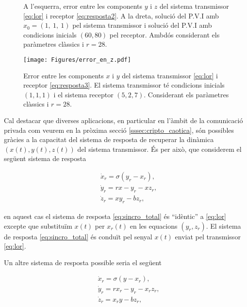 \documentclass[11pt,a4paper,openright,oneside]{article}
\numberwithin{equation}{section}
\theoremstyle{definition}
\begin{document}
\begin{figure}[htpb]
    \centering
    \qquad
    \caption{A l'esquerra, error entre les components $y$ i $z$ del sistema transmissor \eqref{eq:lor} i receptor \eqref{eq:resposta2}. A la dreta, solució del P.V.I amb $x_0=(1, \ 1, \ 1)$ pel sistema transmissor i solució del P.V.I amb condicions inicials $(60, 80)$ pel receptor. Ambdós considerant els paràmetres clàssics i $r=28$.}
    \label{fig:error_en_x}
    \break
    \texttt{[image: Figures/error\_en\_z.pdf]}
    \caption{Error entre les components $x$ i $y$ del sistema transmissor \eqref{eq:lor} i receptor \eqref{eq:resposta3}. El sistema transmissor té condicions inicials $(1,1,1)$ i el sistema receptor $(5,2,7)$. Considerant els paràmetres clàssics i $r=28$.}
    \label{fig:error_en_z}
\end{figure} 


Cal destacar que diverses aplicacions, en particular en l'àmbit de la comunicació privada com veurem en la pròxima secció \ref{sssec:cripto_caotica}, són possibles gràcies a la capacitat del sistema de resposta de recuperar la dinàmica $\left(x(t), y(t), z(t)\right)$ del sistema transmissor. És per això, que considerem el següent sistema de resposta

\begin{equation} \begin{aligned} \label{eq:sincro_total}
    &\dot{x}_r = \sigma(y_r-x_r), \\
    &\dot{y}_r = rx-y_r-xz_r, \\
    &\dot{z}_r = xy_r-bz_r,
\end{aligned}\end{equation}

en aquest cas el sistema de resposta \eqref{eq:sincro_total} és ``idèntic'' a \eqref{eq:lor} excepte que substituïm $x(t)$ per $x_r(t)$ en les equacions $(y_r,z_r)$. El sistema de resposta \eqref{eq:sincro_total} és conduït pel senyal $x(t)$ enviat pel transmissor \eqref{eq:lor}.

Un altre sistema de resposta possible seria el següent 

\begin{equation} \begin{aligned}  \label{eq:sincro_total2}
    &\dot{x}_r = \sigma(y-x_r), \\
    &\dot{y}_r = rx_r-y_r-x_rz_r, \\
    &\dot{z}_r = x_ry-bz_r,
\end{aligned}\end{equation}
\end{document}
